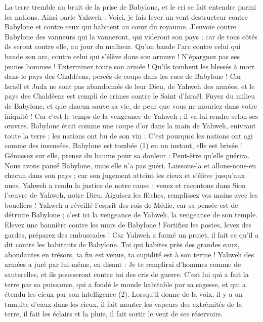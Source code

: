 \begin{multicols}{2}
La terre tremble au bruit de la prise de Babylone, et le cri se fait entendre parmi les nations.
\VerseOne{}Ainsi parle Yahweh : Voici, je fais lever un vent destructeur contre Babylone et contre ceux qui habitent au cœur du royaume.
J'envoie contre Babylone des vanneurs qui la vanneront, qui videront son pays ; car de tous côtés ils seront contre elle, au jour du malheur.
Qu'on bande l'arc contre celui qui bande son arc, contre celui qui s'élève dans son armure ! N’épargnez pas ses jeunes hommes ! Exterminez toute son armée !
Qu’ils tombent les blessés à mort dans le pays des Chaldéens, percés de coups dans les rues de Babylone !
Car Israël et Juda ne sont pas abandonnés de leur Dieu, de Yahweh des armées, et le pays des Chaldéens est rempli de crimes contre le Saint d'Israël.
Fuyez du milieu de Babylone, et que chacun sauve sa vie, de peur que vous ne mouriez dans votre iniquité ! Car c'est le temps de la vengeance de Yahweh ; il va lui rendre selon ses œuvres.
Babylone était comme une coupe d'or dans la main de Yahweh, enivrant toute la terre ; les nations ont bu de son vin : C'est pourquoi les nations ont agi comme des insensées.
Babylone est tombée\FTNT{} (1) en un instant, elle est brisée ! Gémissez sur elle, prenez du baume pour sa douleur : Peut-être qu'elle guérira.
Nous avons pansé Babylone, mais elle n'a pas guéri. Laissons-la et allons-nous-en chacun dans son pays ; car son jugement atteint les cieux et s'élève jusqu’aux nues.
Yahweh a rendu la justice de notre cause ; venez et racontons dans Sion l'œuvre de Yahweh, notre Dieu.
Aiguisez les flèches, remplissez vos mains avec les boucliers ! Yahweh a réveillé l'esprit des rois de Médie, car sa pensée est de détruire Babylone ; c'est ici la vengeance de Yahweh, la vengeance de son temple.
Elevez une bannière contre les murs de Babylone ! Fortifiez les postes, levez des gardes, préparez des embuscades ! Car Yahweh a formé un projet, il fait ce qu'il a dit contre les habitants de Babylone.
Toi qui habites près des grandes eaux, abondantes en trésors, ta fin est venue, ta cupidité est à son terme !
Yahweh des armées a juré par lui-même, en disant : Je te remplirai d'hommes comme de sauterelles, et ils pousseront contre toi des cris de guerre.
C'est lui qui a fait la terre par sa puissance, qui a fondé le monde habitable par sa sagesse, et qui a étendu les cieux par son intelligence\FTNT{} (2).
Lorsqu'il donne de la voix, il y a un tumulte d'eaux dans les cieux, il fait monter les vapeurs des extrémités de la terre, il fait les éclairs et la pluie, il fait sortir le vent de ses réservoirs.

\end{multicols}
